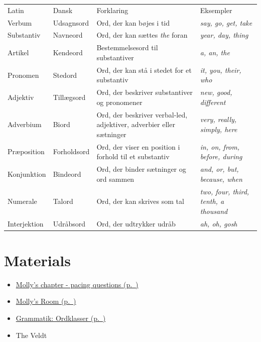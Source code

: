 \documentclass[11pt,a4paper,oneside]{book}
\begin{document}
{\small\setlength{\tabcolsep}{4pt}\renewcommand{\arraystretch}{1.3}\begin{tabularx}{\linewidth}{@{}>{\raggedright\arraybackslash}X>{\raggedright\arraybackslash}X>{\raggedright\arraybackslash}X>{\raggedright\arraybackslash}X@{}}\toprule
Latin & Dansk & Forklaring & Eksempler\\
Verbum & Udsagnsord & Ord, der kan bøjes i tid & \emph{say, go, get, take}\\
Substantiv & Navneord & Ord, der kan sættes \emph{the} foran & \emph{year, day, thing}\\
Artikel & Kendeord & Bestemmelsesord til substantiver & \emph{a, an, the}\\
Pronomen & Stedord & Ord, der kan stå i stedet for et substantiv & \emph{it, you, their, who}\\
Adjektiv & Tillægsord & Ord, der beskriver substantiver og pronomener & \emph{new, good, different}\\
Adverbium & Biord & Ord, der beskriver verbal-led, adjektiver, adverbier eller sætninger & \emph{very, really, simply, here}\\
Præposition & Forholdsord & Ord, der viser en position i forhold til et substantiv & \emph{in, on, from, before, during}\\
Konjunktion & Bindeord & Ord, der binder sætninger og ord sammen & \emph{and, or, but, because, when}\\
Numerale & Talord & Ord, der kan skrives som tal & \emph{two, four, third, tenth, a thousand}\\
Interjektion & Udråbsord & Ord, der udtrykker udråb & \emph{ah, oh, gosh}\\
\bottomrule\end{tabularx}}\par\medskip

\section*{Materials}

\begin{itemize}
\item \hyperref[worksheet-3]{Molly's chapter - pacing questions (p.~\pageref*{worksheet-3})}
\item \hyperref[worksheet-4]{Molly's Room (p.~\pageref*{worksheet-4})}
\item \hyperref[worksheet-5]{Grammatik: Ordklasser (p.~\pageref*{worksheet-5})}
\item The Veldt
\end{itemize}
\end{document}
